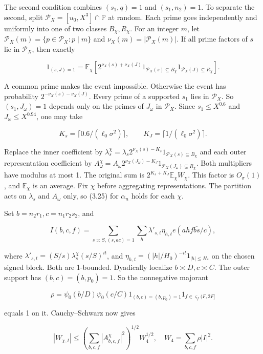 The second condition combines $(s_1,q)=1$ and $(s_1,n_2)=1$.
To separate the second, split $\mathcal P_X=[u_0,X^3]\cap\mathbb P$ at random.
Each prime goes independently and uniformly into one of two classes $B_\chi,R_\chi$.
For an integer $m$, let
$\mathcal P_X(m)=\{p\in\mathcal P_X:p\mid m\}$ and
$\nu_X(m)=|\mathcal P_X(m)|$. If all prime factors of $s$ lie in
$\mathcal P_X$, then exactly

\[
1_{(s,J)=1}=\mathbb E_\chi
 [2^{\nu_X(s)+\nu_X(J)}
  1_{\mathcal P_X(s)\subseteq B_\chi}
  1_{\mathcal P_X(J)\subseteq R_\chi}].
\tag{3.60}
\]

A common prime makes the event impossible.
Otherwise the event has probability $2^{-\nu_X(s)-\nu_X(J)}$.
Every prime of a supported $s_1$ lies in $\mathcal P_X$.
So $(s_1,J_\omega)=1$ depends only on the primes of $J_\omega$ in $\mathcal P_X$.
Since $s_1\le X^{0.6}$ and $J_\omega\le X^{0.94}$,
one may take

\[
K_s=\lceil0.6/(\ell_0\sigma^2)\rceil,\qquad
K_J=\lceil1/(\ell_0\sigma^2)\rceil.
\tag{3.61}
\]

Replace the inner coefficient by
$\lambda_s^\chi=\lambda_s2^{\nu_X(s)-K_s}
1_{\mathcal P_X(s)\subseteq B_\chi}$
and each outer representation coefficient by
$A_\omega^\chi=A_\omega2^{\nu_X(J_\omega)-K_J}
1_{\mathcal P_X(J_\omega)\subseteq R_\chi}$.
Both multipliers have modulus at most 1.
The original sum is $2^{K_s+K_J}\mathbb E_\chi W_\chi$.
This factor is $O_\sigma(1)$, and $\mathbb E_\chi$ is an average.
Fix $\chi$ before aggregating representations.
The partition acts on $\lambda_s$ and $A_\omega$ only, so (3.25) for $\alpha_n$ holds for each $\chi$.

Set $b=n_2r_1,c=n_1r_2s_2$, and

\[
I(b,c,f)=\sum_{s\asymp S,(s,ac)=1}\sum_h
             \lambda'_{s,t}\eta_{h,t}
             e(ahf\overline{bs}/c),
\tag{3.62}
\]

where $\lambda'_{s,t}=(S/s)\lambda_s^\chi(s/S)^{it}$, and
$\eta_{h,t}=(|h|/H_0)^{-it}1_{|h|\le H_*}$ on the chosen signed
block. Both are 1-bounded. Dyadically localize $b\asymp D,c\asymp C$.
The outer support has $(b,c)=(b,p_0)=1$. So the nonnegative majorant

\[
\rho=\psi_0(b/D)\psi_0(c/C)1_{(b,c)=(b,p_0)=1}
                                   1_{f\in\varsigma_f(F,2F]}
\tag{3.63}
\]

\noindent equals 1 on it. Cauchy--Schwarz now gives

\[
|W_{\chi,t}|\le\left(\sum_{b,c,f}|A_{b,c,f}^\chi|^2\right)^{1/2}
               W_4^{1/2},\quad W_4=\sum_{b,c,f}\rho|I|^2.
\tag{3.64}
\]

